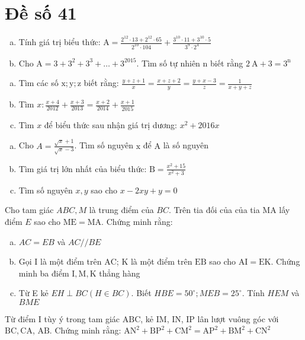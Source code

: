 \section{Đề số 41}

\begin{bt} 
	\hfill
	\begin{enumerate}[a.]
		\item Tính giá trị biểu thức: $\mathrm{A}=\frac{2^{12} \cdot 13+2^{12} \cdot 65}{2^{10} \cdot 104}+\frac{3^{10} \cdot 11+3^{10} \cdot 5}{3^9 \cdot 2^4}$
		\item Cho $\mathrm{A}=3+3^2+3^3+\ldots+3^{2015}$. Tìm số tự nhiên $\mathrm{n}$ biết rằng $2 \mathrm{~A}+3=3^{\mathrm{n}}$
	\end{enumerate}
	\loigiai{} 
\end{bt}

\begin{bt}
	\hfill
	\begin{enumerate}[a.]
		\item Tìm các số $\mathrm{x} ; \mathrm{y} ; \mathrm{z}$ biết rằng: $\frac{y+z+1}{x}=\frac{x+z+2}{y}=\frac{y+x-3}{z}=\frac{1}{x+y+z}$
		\item Tìm $x: \frac{x+4}{2012}+\frac{x+3}{2013}=\frac{x+2}{2014}+\frac{x+1}{2015}$
		\item Tìm $x$ để biểu thức sau nhận giá trị dương: $x^2+2016 x$
	\end{enumerate}
	\loigiai{} 
\end{bt}

\begin{bt}
	\hfill 
	\begin{enumerate}[a.]
		\item Cho $A=\frac{\sqrt{x}+1}{\sqrt{x}-3}$. Tìm số nguyên $\mathrm{x}$ để $\mathrm{A}$ là số nguyên
		\item Tìm giá trị lớn nhất của biểu thức: $\mathrm{B}=\frac{x^2+15}{x^2+3}$
		\item Tìm số nguyên $x, y$ sao cho $x-2 x y+y=0$
	\end{enumerate}
	\loigiai{} 
\end{bt}

\begin{bt}
	Cho tam giác $A B C, M$ là trung điểm của $B C$. Trên tia đối của của tia MA lấy điểm $E$ sao cho $\mathrm{ME}=\mathrm{MA}$. Chứng minh rằng:
	\begin{enumerate}[a.]
		\item $A C=E B$ và $A C / / B E$
		\item Gọi $\mathrm{I}$ là một điểm trên $\mathrm{AC}$; $\mathrm{K}$ là một điểm trên $\mathrm{EB}$ sao cho $\mathrm{AI}=\mathrm{EK}$. Chứng minh ba điểm $\mathrm{I}, \mathrm{M}, \mathrm{K}$ thẳng hàng
		\item Từ E kẻ $E H \perp B C(H \in B C)$. Biết $H B E=50^{\circ} ; M E B=25^{\circ}$.
		Tính $H E M$ và $B M E$
	\end{enumerate}
	\loigiai{}
\end{bt}

\begin{bt}
	Từ điểm I tùy ý trong tam giác $\mathrm{ABC}$, kẻ $\mathrm{IM}$, IN, IP lân lượt vuông góc với $\mathrm{BC}, \mathrm{CA}$, $\mathrm{AB}$. Chứng minh rằng: $\mathrm{AN}^2+\mathrm{BP}^2+\mathrm{CM}^2=\mathrm{AP}^2+\mathrm{BM}^2+\mathrm{CN}^2$
	\loigiai{}
\end{bt}
